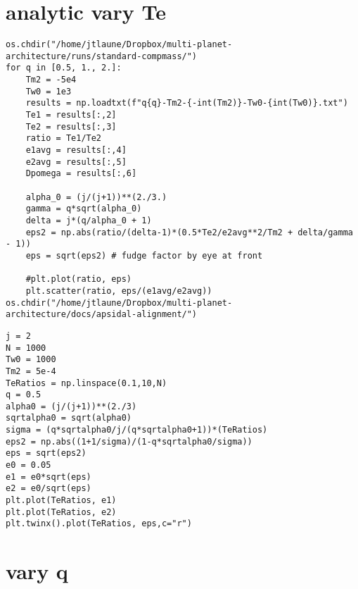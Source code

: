 \documentclass[11pt]{article}
\begin{document}
\section{analytic vary Te}
\label{sec:org1eaf760}
\begin{verbatim}
os.chdir("/home/jtlaune/Dropbox/multi-planet-architecture/runs/standard-compmass/")
for q in [0.5, 1., 2.]:
    Tm2 = -5e4
    Tw0 = 1e3
    results = np.loadtxt(f"q{q}-Tm2-{-int(Tm2)}-Tw0-{int(Tw0)}.txt")
    Te1 = results[:,2]
    Te2 = results[:,3]
    ratio = Te1/Te2
    e1avg = results[:,4]
    e2avg = results[:,5]
    Dpomega = results[:,6]

    alpha_0 = (j/(j+1))**(2./3.)
    gamma = q*sqrt(alpha_0)
    delta = j*(q/alpha_0 + 1)
    eps2 = np.abs(ratio/(delta-1)*(0.5*Te2/e2avg**2/Tm2 + delta/gamma - 1))
    eps = sqrt(eps2) # fudge factor by eye at front

    #plt.plot(ratio, eps)
    plt.scatter(ratio, eps/(e1avg/e2avg))
os.chdir("/home/jtlaune/Dropbox/multi-planet-architecture/docs/apsidal-alignment/")
\end{verbatim}

\begin{verbatim}
j = 2
N = 1000
Tw0 = 1000
Tm2 = 5e-4
TeRatios = np.linspace(0.1,10,N)
q = 0.5
alpha0 = (j/(j+1))**(2./3)
sqrtalpha0 = sqrt(alpha0)
sigma = (q*sqrtalpha0/j/(q*sqrtalpha0+1))*(TeRatios)
eps2 = np.abs((1+1/sigma)/(1-q*sqrtalpha0/sigma))
eps = sqrt(eps2)
e0 = 0.05
e1 = e0*sqrt(eps)
e2 = e0/sqrt(eps)
plt.plot(TeRatios, e1)
plt.plot(TeRatios, e2)
plt.twinx().plot(TeRatios, eps,c="r")
\end{verbatim}

\section{vary q}
\label{sec:orgb82c76d}
\end{document}

